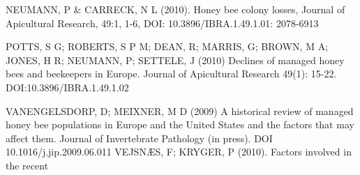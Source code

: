 \documentclass[11pt]{article}
\begin{document}
NEUMANN, P \& CARRECK, N L (2010). Honey bee colony losses, Journal of
Apicultural Research, 49:1, 1-6, DOI: 10.3896/IBRA.1.49.1.01: 2078-6913

POTTS, S G; ROBERTS, S P M; DEAN, R; MARRIS, G; BROWN, M A; JONES, H R;
NEUMANN, P; SETTELE, J (2010) Declines of managed honey bees and
beekeepers in Europe. Journal of Apicultural Research 49(1): 15-22.
DOI:10.3896/IBRA.1.49.1.02

VANENGELSDORP, D; MEIXNER, M D (2009) A historical review of managed
honey bee populations in Europe and the United States and the factors
that may affect them. Journal of Invertebrate Pathology (in press). DOI
10.1016/j.jip.2009.06.011 VEJSNÆS, F; KRYGER, P (2010). Factors involved
in the recent


    
    
    
    
\end{document}
